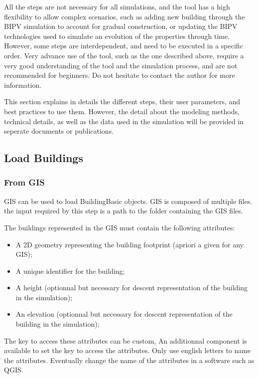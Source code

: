 \documentclass[a4paper,12pt]{article} %
\begin{document}
All the steps are not necessary for all simulations, and the tool has a high flexibility to allow complex scenarios, such as adding new building through the BIPV simulation to account for gradual construction, or updating the BIPV technologies used to simulate an evolution of the properties through time.
However, some steps are interdependent, and need to be executed in a specific order.
Very advance use of the tool, such as the one described above, require a very good understanding of the tool and the simulation process, and are not recommended for beginners.
Do not hesitate to contact the author for more information.

This section explains in details the different steps, their user parameters, and best practices to use them.
However, the detail about the modeling methods, technical details, as well as the data used in the simulation will be provided in seperate documents or publications.

    \subsection{Load Buildings}
    \label{subsec:load-buildings}

        \subsubsection{From GIS}
        \label{subsubsec:from-gis}
        GIS can be used to load \gls{BuildingBasic} objects.
        GIS is composed of multiple files.
        the input required by this step is a path to the folder containing the GIS files.

        The buildings represented in the GIS must contain the following attributes:
        \begin{itemize}
            \item A 2D geometry representing the building footprint (apriori a given for any GIS);
            \item A unique identifier for the building;
            \item A height (optionnal but necessary for descent representation of the building in the simulation);
            \item An elevation (optionnal but necessary for descent representation of the building in the simulation);
        \end{itemize}

        The key to access these attributes can be custom, An additionnal component is available to set the key to access the attributes.
        Only use english letters to name the attributes.
        Eventually change the name of the attributes in a software such as QGIS.
\end{document}
